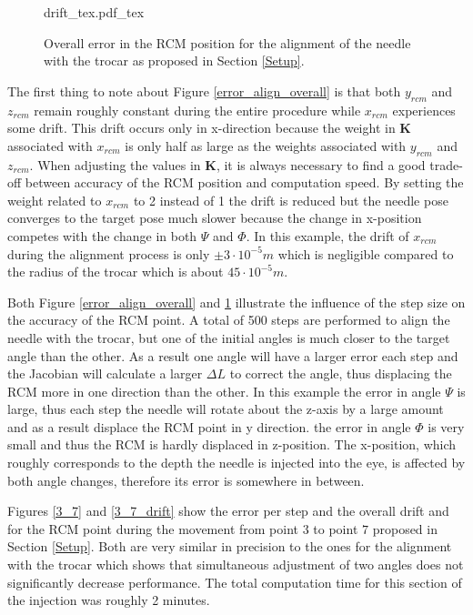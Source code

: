 \begin{figure}[b!]
	\begin{center}
		{drift_tex.pdf_tex}
		\caption{ Overall error in the RCM position for the alignment of the needle with the trocar as proposed in Section \ref{Setup}. }
		\label{error_align}
	\end{center}
\end{figure}

The first thing to note about Figure \ref{error_align_overall} is that both $y_{rcm}$ and $z_{rcm}$ remain roughly constant during the entire procedure while $x_{rcm}$ experiences some drift. This drift occurs only in x-direction because the weight in $\bm{K}$ associated with $x_{rcm}$ is only half as large as the weights associated with $y_{rcm}$ and $z_{rcm}$.  When adjusting the values in $\bm{K}$, it is always necessary to find a good trade-off between accuracy of the RCM position and computation speed. By setting the weight related to $x_{rcm}$ to 2 instead of 1 the drift is reduced but the needle pose converges to the target pose much slower because the change in x-position competes with the change in both $\Psi$ and $\Phi$. In this example, the drift of $x_{rcm}$ during the alignment process is only $\pm3\cdot10^{-5}m$ which is negligible compared to the radius of the trocar which is about $45\cdot10^{-5}m$.

Both Figure \ref{error_align_overall} and \ref{error_align} illustrate the influence of the step size on the accuracy of the RCM point. A total of 500 steps are performed to align the needle with the trocar, but one of the initial angles is much closer to the target angle than the other. As a  result one angle will have a larger error each step and the Jacobian will calculate a larger $\Delta L$ to correct the angle, thus displacing the RCM more in one direction than the other. In this example the error in angle $\Psi$ is large, thus each step the needle will rotate about the z-axis by a large amount and as a result displace the RCM point in y direction. the error in angle $\Phi$ is very small and thus the RCM is hardly displaced in z-position. The x-position, which roughly corresponds to the depth the needle is injected into the eye, is affected by both angle changes, therefore its error is somewhere in between.

Figures \ref{3_7} and \ref{3_7_drift} show the error per step and the overall drift and  for the RCM point during the movement from point $3$ to point $7$ proposed in Section \ref{Setup}. Both are very similar in precision to the ones for the alignment with the trocar which shows that simultaneous adjustment of two angles does not significantly decrease performance. The total computation time for this section of the injection was roughly 2 minutes. 

